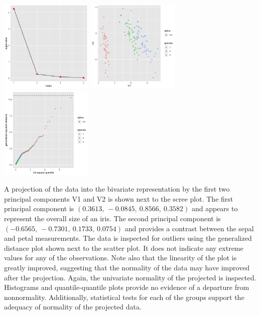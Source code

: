 \begin{enumerate}
\begin{center}
	\includegraphics[width=1.75in]{II_5_scree.png}
	\includegraphics[width=1.75in]{II_5_scatter.png}
	\includegraphics[width=1.75in]{II_5_chisq.png}
\end{center}

	A projection of the data into the bivariate representation by the first two principal components V1 and V2 is shown next to the scree plot. The first principal component is $(0.3613,\ -0.0845,\ 0.8566,\ 0.3582)$ and appears to represent the overall size of an iris. The second principal component is $(-0.6565,\ -0.7301,\ 0.1733,\ 0.0754)$ and provides a contrast between the sepal and petal measurements. The data is inspected for outliers using the generalized distance plot shown next to the scatter plot. It does not indicate any extreme values for any of the observations. Note also that the linearity of the plot is greatly improved, suggesting that the normality of the data may have improved after the projection. Again, the univariate normality of the projected is inspected. Histograms and quantile-quantile plots provide no evidence of a departure from nonnormality. Additionally, statistical tests for each of the groups support the adequacy of normality of the projected data.


\end{enumerate}
